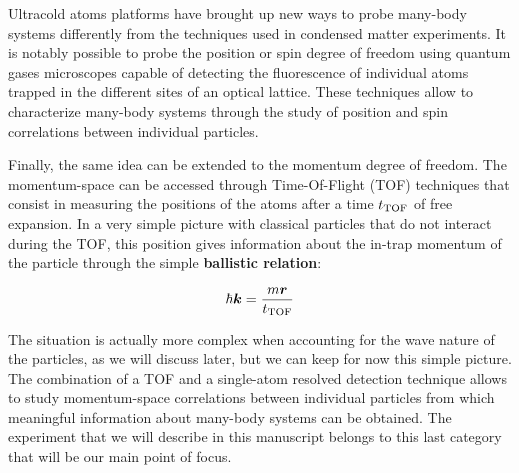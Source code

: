 Ultracold atoms platforms have brought up new ways to probe many-body systems differently from the techniques used in condensed matter experiments. It is notably possible to probe the position or spin degree of freedom using quantum gases microscopes \cite{bakr2009quantum,cheuk2015quantum,esteve2008squeezing,sherson2010single} capable of detecting the fluorescence of individual atoms trapped in the different sites of an optical lattice. These techniques allow to characterize many-body systems through the study of position and spin correlations between individual particles.

Finally, the same idea can be extended to the momentum degree of freedom. The momentum-space can be accessed through Time-Of-Flight (TOF) techniques \cite{greiner2002quantum,spielman2008condensate,xu2006observation} that consist in measuring the positions of the atoms after a time $t_{\rm{TOF}}$ of free expansion. In a very simple picture with classical particles that do not interact during the TOF, this position gives information about the in-trap momentum of the particle through the simple \textbf{ballistic relation}:

\begin{equation}
    \hbar \bm{k} = \frac{m \bm{r}}{t_{\rm{TOF}}}
\end{equation} 

The situation is actually more complex when accounting for the wave nature of the particles, as we will discuss later, but we can keep for now this simple picture. The combination of a TOF and a single-atom resolved detection technique allows to study momentum-space correlations between individual particles from which meaningful information about many-body systems can be obtained. The experiment that we will describe in this manuscript belongs to this last category that will be our main point of focus.





